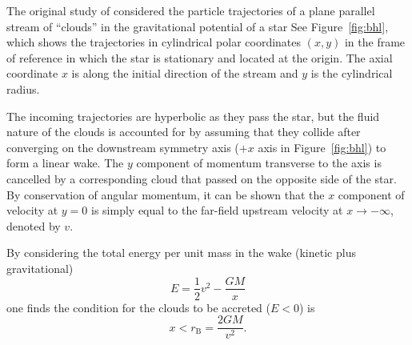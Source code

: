 \documentclass[useAMS, usenatbib, a4paper]{mnras}
\newcommand\bhl{\ensuremath{_{\mathrm{\scriptscriptstyle B}}}}
\begin{document}
The original study of \citep{Hoyle:1939a} considered the
particle trajectories of a plane parallel stream of ``clouds'' in the
gravitational potential of a star
See Figure~\ref{fig:bhl}, which shows the trajectories in cylindrical polar
coordinates \((x, y)\) in the frame of reference in which the star is stationary
and located at the origin. 
The axial coordinate \(x\) is along the initial direction of the stream
and \(y\) is the cylindrical radius. 

The incoming trajectories are hyperbolic as they pass the star,
but the fluid nature of the clouds is accounted for
by assuming that they collide after converging on the downstream symmetry axis
(\(+x\) axis in Figure~\ref{fig:bhl})
to form a linear wake.
The \(y\) component of momentum transverse to the axis is cancelled by
a corresponding cloud that passed on the opposite side of the star.
By conservation of angular momentum,
it can be shown that the \(x\) component of velocity at \(y = 0\)
is simply equal to the far-field upstream velocity at \(x \to -\infty\),
denoted by \(v\).

By considering the total energy per unit mass in the wake (kinetic plus gravitational)
\begin{equation}
  \label{eq:3}
  E = \frac12 v^2 - \frac{G M}{x}
\end{equation}
one finds the condition for the clouds to be accreted (\(E < 0\)) is 
\begin{equation}
  \label{eq:x-accretion-condition}
  x < r\bhl = \frac{2 G M}{v^2} .
\end{equation}
\end{document}
